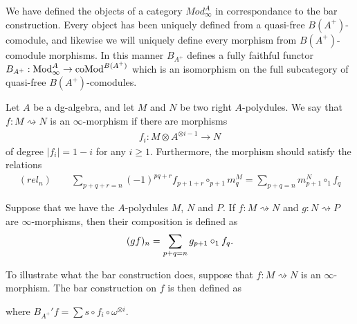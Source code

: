 \documentclass[../thesis.tex]{subfiles}
\begin{document}
            We have defined the objects of a category $Mod_\infty^A$ in correspondance to the bar construction. Every object has been uniquely defined from a quasi-free $B(A^+)$-comodule, and likewise we will uniquely define every morphism from $B(A^+)$-comodule morphisms. In this manner $B_{A^+}$ defines a fully faithful functor $B_{A^+} : \tt{Mod}_\infty^A \rightarrow \tt{coMod}^{B(A^+)}$ which is an isomorphism on the full subcategory of quasi-free $B(A^+)$-comodules.
            
            \begin{definition}
                Let $A$ be a dg-algebra, and let $M$ and $N$ be two right $A$-polydules. We say that $f : M \rightsquigarrow N$ is an $\infty$-morphism if there are morphisms
                \begin{align*}
                    f_i : M \otimes A^{\otimes i - 1} \rightarrow N
                \end{align*}
                of degree $|f_i| = 1 - i$ for any $i \geq 1$. Furthermore, the morphism should satisfy the relations
                \begin{align*}
                    (rel_n)\qquad \sum_{p+q+r = n} (-1)^{pq+r}f_{p+1+r} \circ_{p+1} m^M_{q} = \sum_{p+q = n} m^N_{p+1} \circ_1 f_q
                \end{align*}
            \end{definition}
            

            Suppose that we have the $A$-polydules $M$, $N$ and $P$. If $f : M \rightsquigarrow N$ and $g : N \rightsquigarrow P$ are $\infty$-morphisms, then their composition is defined as
            \begin{align*}
                (gf)_n = \sum_{p+q=n}g_{p+1}\circ_1 f_q\tt{.}
            \end{align*}

            To illustrate what the bar construction does, suppose that $f : M \rightsquigarrow N$ is an $\infty$-morphism. The bar construction on $f$ is then defined as
            \begin{center}
            \end{center}
            where $B_{A^+}'f = \sum s \circ f_i \circ \omega^{\otimes i}$.
\end{document}
